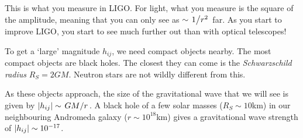 \begin{example}
  This is what you measure in LIGO.
  For light, what you measure is the square of the amplitude, meaning that you can only see as $\sim\flatfrac{1}{r^2}$ far. As you start to improve LIGO, you start to see much further out than with optical telescopes!

  To get a `large' magnitude $h_{ij}$, we need compact objects nearby.
  The most compact objects are black holes. The closest they can come is the \emph{Schwarzschild radius} $R_S = 2 G M$. Neutron stars are not wildly different from this.

  As these objects approach, the size of the gravitational wave that we will see is given by $\abs{h_{ij}} \sim \flatfrac{GM}{r}$.
  A black hole of a few solar masses ($R_S \sim 10$km) in our neighbouring Andromeda galaxy ($r \sim 10^{18}$km) gives a gravitational wave strength of $\abs{h_{ij}} \sim 10^{-17}$.
\end{example}

